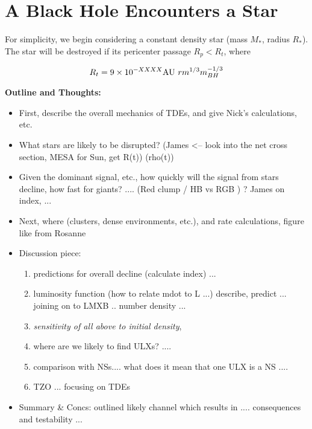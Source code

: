 \section{A Black Hole Encounters a Star}\label{section:general}


For simplicity, we begin considering a constant density star (mass $M_*$, radius $R_*$).  The star will be destroyed if its pericenter passage $R_p < R_t$, where

\begin{equation}
R_t = 9 \times 10^{-XXXX} {\rm AU}~ r m^{1/3} m_{BH}^{-1/3}
\end{equation}


\bf{Outline and Thoughts:}\\
\begin{itemize}
\item First, describe the overall mechanics of TDEs, and give Nick's calculations, etc. \\
\item What stars are likely to be disrupted?  (James <-- look into the net cross section, MESA for Sun, get R(t)) (rho(t)) \\
\item Given the dominant signal, etc., how quickly will the signal from stars decline, how fast for giants? .... (Red clump / HB vs RGB ) ?  James on index, ... \\ 
\item Next, where (clusters, dense environments, etc.), and rate calculations, figure like from Rosanne \\
\item Discussion piece: 
\begin{enumerate}
    \item predictions for overall decline (calculate index) ... 
    \item luminosity function (how to relate mdot to L ...) describe, predict  ... joining on to LMXB .. number density ... 
    \item {\it sensitivity of all above to initial density},  
    \item where are we likely to find ULXs? .... 
    \item comparison with NSs.... what does it mean that one ULX is a NS .... 
    \item TZO ... focusing on TDEs 
    \end{enumerate}
    
\item Summary & Concs: outlined likely channel which results in .... consequences and testability ... 
\end{itemize}






